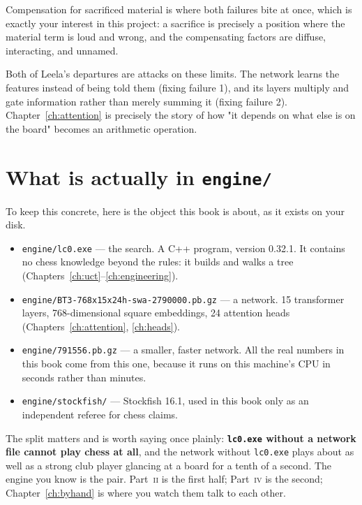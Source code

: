 Compensation for sacrificed material is where both failures bite at once, which is exactly
your interest in this project: a sacrifice is precisely a position where the material term
is loud and wrong, and the compensating factors are diffuse, interacting, and unnamed.

\begin{keyidea}
Both of Leela's departures are attacks on these limits. The network learns the features
instead of being told them (fixing failure 1), and its layers multiply and gate information
rather than merely summing it (fixing failure 2). Chapter~\ref{ch:attention} is precisely
the story of how "it depends on what else is on the board" becomes an arithmetic operation.
\end{keyidea}

\section{What is actually in \texttt{engine/}}

To keep this concrete, here is the object this book is about, as it exists on your disk.

\begin{repobox}[title={in this repository}]
\begin{itemize}
\item \texttt{engine/lc0.exe} --- the search. A C++ program, version 0.32.1. It contains no
  chess knowledge beyond the rules: it builds and walks a tree
  (Chapters~\ref{ch:uct}--\ref{ch:engineering}).
\item \texttt{engine/BT3-768x15x24h-swa-2790000.pb.gz} --- a network. 15 transformer layers,
  768-dimensional square embeddings, 24 attention heads (Chapters~\ref{ch:attention},
  \ref{ch:heads}).
\item \texttt{engine/791556.pb.gz} --- a smaller, faster network. All the real numbers in
  this book come from this one, because it runs on this machine's CPU in seconds rather
  than minutes.
\item \texttt{engine/stockfish/} --- Stockfish 16.1, used in this book only as an
  independent referee for chess claims.
\end{itemize}
\end{repobox}

The split matters and is worth saying once plainly: \textbf{\texttt{lc0.exe} without a
network file cannot play chess at all}, and the network without \texttt{lc0.exe} plays about
as well as a strong club player glancing at a board for a tenth of a second. The engine you
know is the pair. Part~\textsc{ii} is the first half; Part~\textsc{iv} is the second;
Chapter~\ref{ch:byhand} is where you watch them talk to each other.

